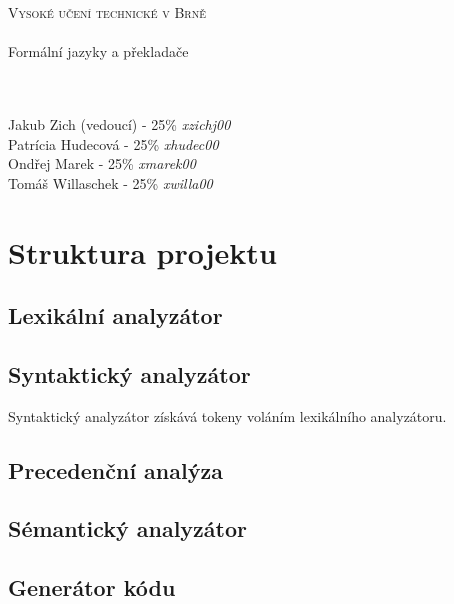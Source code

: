 \documentclass[11pt, a4paper]{article}
\begin{document}
	\begin{titlepage}
		\begin{center}
			 \textsc{{\Huge Vysoké učení technické v Brně}\\ 
			 \vspace{8.5pt}{\huge Fakulta informačních technologií}}\\
			{\LARGE Formální jazyky a překladače\\}
				\vspace{5pt}{\Huge Dokumentace ke skupinovému projektu}\\
				\vspace{2pt}{\Large Tým 47, varianta I}
			\\
		\end{center}
		{\small Jakub Zich (vedoucí) - 25\% \emph{xzichj00} \hfill \\
		Patrícia Hudecová - 25\% \emph{xhudec00} \hfill \\
		Ondřej Marek - 25\% \emph{xmarek00} \hfill\\
		Tomáš Willaschek - 25\% \emph{xwilla00} \hfill }
	
	\end{titlepage}	
	\section{Struktura projektu}
	
	\subsection{Lexikální analyzátor}
	\subsection{Syntaktický analyzátor}
	Syntaktický analyzátor získává tokeny voláním lexikálního analyzátoru.
	\subsection{Precedenční analýza}
	\subsection{Sémantický analyzátor}
	\subsection{Generátor kódu}
\end{document}
